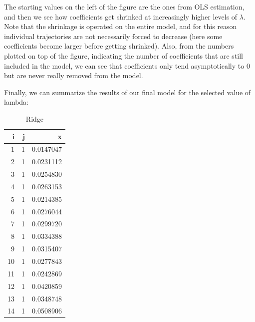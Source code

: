 \documentclass[
]{book}
\newenvironment{Shaded}{\begin{snugshade}}{\end{snugshade}}
\newcommand{\AttributeTok}[1]{\textcolor[rgb]{0.77,0.63,0.00}{#1}}
\newcommand{\ConstantTok}[1]{\textcolor[rgb]{0.00,0.00,0.00}{#1}}
\newcommand{\DecValTok}[1]{\textcolor[rgb]{0.00,0.00,0.81}{#1}}
\newcommand{\FunctionTok}[1]{\textcolor[rgb]{0.00,0.00,0.00}{#1}}
\newcommand{\NormalTok}[1]{#1}
\newcommand{\OtherTok}[1]{\textcolor[rgb]{0.56,0.35,0.01}{#1}}
\newcommand{\SpecialCharTok}[1]{\textcolor[rgb]{0.00,0.00,0.00}{#1}}
\newcommand{\StringTok}[1]{\textcolor[rgb]{0.31,0.60,0.02}{#1}}
\begin{document}
The starting values on the left of the figure are the ones from OLS estimation, and then we see how coefficients get shrinked at increasingly higher levels of \(\lambda\). Note that the shrinkage is operated on the entire model, and for this reason individual trajectories are not necessarily forced to decrease (here some coefficients become larger before getting shrinked). Also, from the numbers plotted on top of the figure, indicating the number of coefficients that are still included in the model, we can see that coefficients only tend asymptotically to 0 but are never really removed from the model.

Finally, we can summarize the results of our final model for the selected value of lambda:

\begin{Shaded}
\end{Shaded}

\begin{table}

\caption{\label{tab:unnamed-chunk-16}Ridge}
\centering
\begin{tabular}[t]{r|r|r}
\hline
i & j & x\\
\hline
1 & 1 & 0.0147047\\
\hline
2 & 1 & 0.0231112\\
\hline
3 & 1 & 0.0254830\\
\hline
4 & 1 & 0.0263153\\
\hline
5 & 1 & 0.0214385\\
\hline
6 & 1 & 0.0276044\\
\hline
7 & 1 & 0.0299720\\
\hline
8 & 1 & 0.0334388\\
\hline
9 & 1 & 0.0315407\\
\hline
10 & 1 & 0.0277843\\
\hline
11 & 1 & 0.0242869\\
\hline
12 & 1 & 0.0420859\\
\hline
13 & 1 & 0.0348748\\
\hline
14 & 1 & 0.0508906\\
\hline
\end{tabular}
\end{table}
\end{document}
